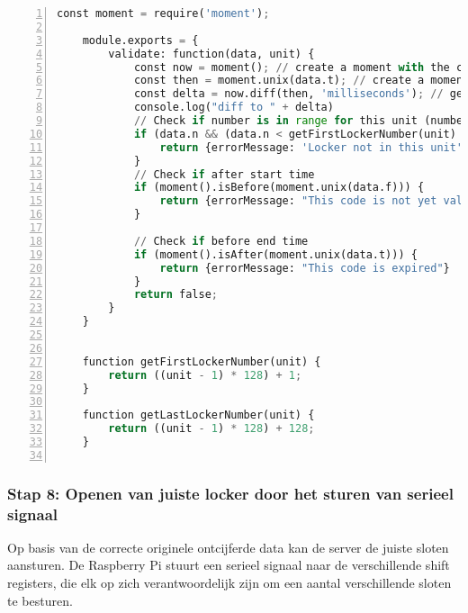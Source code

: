 \begin{lstlisting}[language=Python, caption={Validatie van QR-code op tijd en bijpassende QR-unit.}, label=lst:data-validator, numbers=left]
    const moment = require('moment');
    
    module.exports = {
        validate: function(data, unit) {
            const now = moment(); // create a moment with the current time
            const then = moment.unix(data.t); // create a moment with the other time timestamp in seconds
            const delta = now.diff(then, 'milliseconds'); // get the millisecond difference
            console.log("diff to " + delta)
            // Check if number is in range for this unit (number is not mandatory)
            if (data.n && (data.n < getFirstLockerNumber(unit) || data.n > getLastLockerNumber(unit))) {
                return {errorMessage: 'Locker not in this unit'}
            }
            // Check if after start time
            if (moment().isBefore(moment.unix(data.f))) {
                return {errorMessage: "This code is not yet valid"}
            }
            
            // Check if before end time
            if (moment().isAfter(moment.unix(data.t))) {
                return {errorMessage: "This code is expired"}
            }
            return false;
        }
    }
    
    
    function getFirstLockerNumber(unit) {
        return ((unit - 1) * 128) + 1;
    }
    
    function getLastLockerNumber(unit) {
        return ((unit - 1) * 128) + 128;
    }
    
\end{lstlisting}
\newpage
\subsubsection{Stap 8: Openen van juiste locker door het sturen van serieel signaal} 

Op basis van de correcte originele ontcijferde data kan de server de juiste sloten aansturen. De Raspberry Pi stuurt een serieel signaal naar de verschillende shift registers, die elk op zich verantwoordelijk zijn om een aantal verschillende sloten te besturen.

